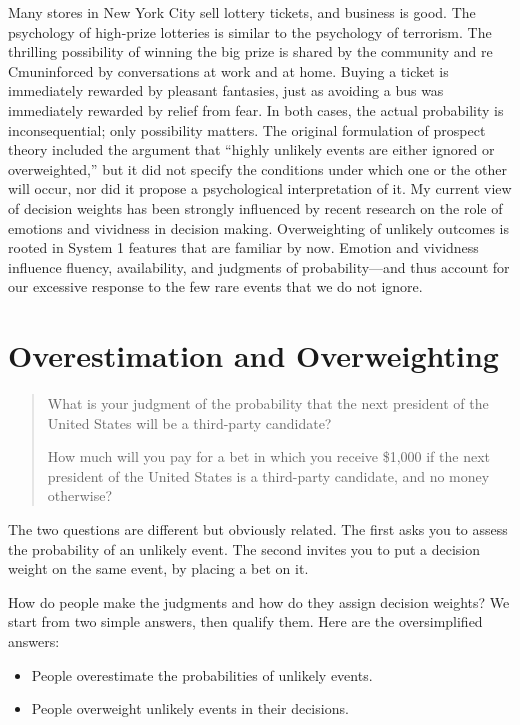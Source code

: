 \documentclass[11pt]{article}
\begin{document}
Many stores in New York City sell lottery tickets, and business is good. The psychology of high-prize lotteries is similar to the psychology of terrorism. The thrilling possibility of winning the big prize is shared by the community and re Cmuninforced by conversations at work and at home. Buying a ticket is immediately rewarded by pleasant fantasies, just as avoiding a bus was immediately rewarded by relief from fear. In both cases, the actual probability is inconsequential; only possibility matters. The original formulation of prospect theory included the argument that “highly unlikely events are either ignored or overweighted,” but it did not specify the conditions under which one or the other will occur, nor did it propose a psychological interpretation of it. My current view of decision weights has been strongly influenced by recent research on the role of emotions and vividness in decision making. Overweighting of unlikely outcomes is rooted in System 1 features that are familiar by now. Emotion and vividness influence fluency, availability, and judgments of probability—and thus account for our excessive response to the few rare events that we do not ignore.

\section{Overestimation and Overweighting}
\label{sec:orgcf8285c}

\begin{quote}
What is your judgment of the probability that the next president of the United States will be a third-party candidate?

How much will you pay for a bet in which you receive \$1,000 if the next president of the United States is a third-party candidate, and no money otherwise?
\end{quote}


The two questions are different but obviously related. The first asks you to assess the probability of an unlikely event. The second invites you to put a decision weight on the same event, by placing a bet on it.

How do people make the judgments and how do they assign decision weights? We start from two simple answers, then qualify them. Here are the oversimplified answers:

\begin{itemize}
\item People overestimate the probabilities of unlikely events.
\item People overweight unlikely events in their decisions.
\end{itemize}
\end{document}
